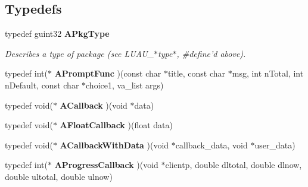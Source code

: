 \subsection*{Typedefs}
\begin{CompactItemize}
\item 
typedef guint32 {\bf APkg\-Type}
\begin{CompactList}\small\item\em Describes a type of package (see LUAU\_\-$\ast$type$\ast$, \#define'd above). \item\end{CompactList}\item 
typedef int($\ast$ {\bf APrompt\-Func} )(const char $\ast$title, const char $\ast$msg, int n\-Total, int n\-Default, const char $\ast$choice1, va\_\-list args)
\item 
typedef void($\ast$ {\bf ACallback} )(void $\ast$data)
\item 
typedef void($\ast$ {\bf AFloat\-Callback} )(float data)
\item 
typedef void($\ast$ {\bf ACallback\-With\-Data} )(void $\ast$callback\_\-data, void $\ast$user\_\-data)
\item 
typedef int($\ast$ {\bf AProgress\-Callback} )(void $\ast$clientp, double dltotal, double dlnow, double ultotal, double ulnow)
\end{CompactItemize}
